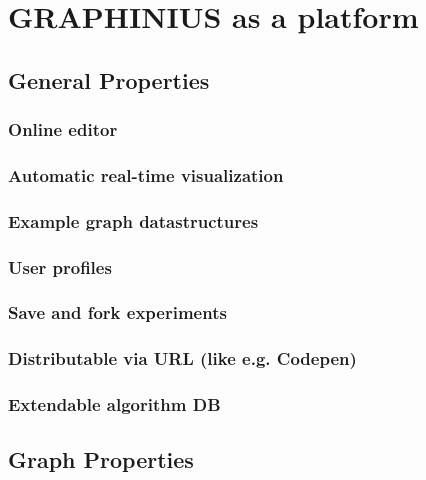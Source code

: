 \chapter{GRAPHINIUS as a platform}
\label{ch:graphinius_platform}


\section{General Properties}
\label{sect:general_properties}
	
	\subsection{Online editor}
	\label{ssect:online_editor}
	
	\subsection{Automatic real-time visualization}
	\label{ssect:realtime_vis}
	
	\subsection{Example graph datastructures}
	\label{ssect:pre_settings}
	
	\subsection{User profiles}
	\label{ssect:user_profiles}
	
	\subsection{Save and fork experiments}
	\label{ssect:save_fork}
	
	\subsection{Distributable via URL (like e.g. Codepen)}
	\label{ssect:distribute_url}
	
	\subsection{Extendable algorithm DB}
	\label{ssect:ext_algo_db}



\section{Graph Properties}
\label{sect:graph_properties}

